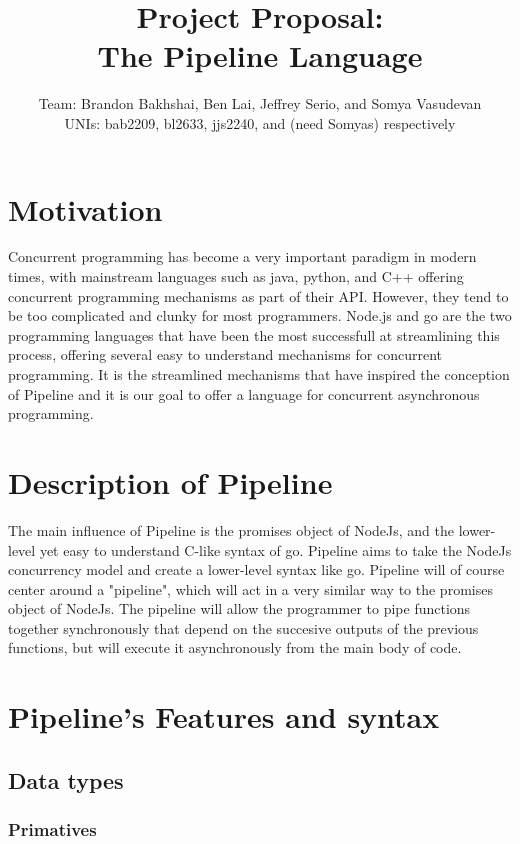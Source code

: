 \documentclass[11pt]{article}
\title{\textbf{Project Proposal:\\ The Pipeline Language}}
\author{Team: Brandon Bakhshai, Ben Lai, Jeffrey Serio, and Somya Vasudevan \\ UNIs: bab2209, bl2633, jjs2240, and (need Somyas) respectively}
\begin{document}
\maketitle
\thispagestyle{empty}
\renewcommand{\thesubsubsection}{\thesubsection.\alph{subsubsection}.} 


\section{Motivation}
\hspace{0.5cm} Concurrent programming has become a very important paradigm in modern times, with mainstream languages such as java, python, and C++ offering concurrent programming mechanisms as part of their API. However, they tend to be too complicated and clunky for most programmers. Node.js and go are the two programming languages that have been the most successfull at streamlining this process, offering several easy to understand mechanisms for concurrent programming. It is the streamlined mechanisms that have inspired the conception of Pipeline and it is our goal to offer a language for concurrent asynchronous programming.

\section{Description of Pipeline}
\hspace{0.5cm} The main influence of Pipeline is the promises object of NodeJs, and the lower-level yet easy to understand C-like syntax of go. Pipeline aims to take the NodeJs concurrency model and create a lower-level syntax like go. Pipeline will of course center around a "pipeline", which will act in a very similar way to the promises object of NodeJs. The pipeline will allow the programmer to pipe functions together synchronously that depend on the succesive outputs of the previous functions, but will execute it asynchronously from the main body of code. 

\section{Pipeline's Features and syntax}
\subsection{Data types}
\subsubsection{Primatives}
\end{document}
